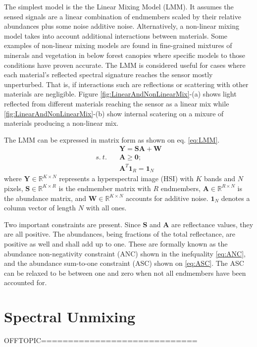 The simplest model is the the Linear Mixing Model (LMM).  It assumes the sensed signals are a linear combination of endmembers scaled by their relative abundances plus some noise additive noise.  Alternatively, a non-linear mixing model takes into account additional interactions between materials.  Some examples of non-linear mixing models are found in fine-grained mixtures of minerals and vegetation in below forest canopies where specific models to those conditions have proven accurate.  The LMM is considered useful for cases where each material's reflected spectral signature reaches the sensor mostly unperturbed.  That is, if interactions such are reflections or scattering with other materials are negligible.  Figure \ref{fig:LinearAndNonLinearMix}-(a) shows light reflected from different materials reaching the sensor as a linear mix while \ref{fig:LinearAndNonLinearMix}-(b) show internal scatering on a mixure of materials producing a non-linear mix.

The LMM can be expressed in matrix form as shown on eq. \eqref{eq:LMM}.
\begin{align}
	&\mathbf{Y}=\mathbf{SA+W} \label{eq:LMM} \\
	s.\ t.\quad &\mathbf{A\geq0}; \label{eq:ANC} \\
	&\mathbf{A}^T\mathbf{1}_{R} =\mathbf{1}_{N} \label{eq:ASC}
\end{align}
where $\mathbf{Y} \in \mathbb{R}^{K \times N}$ represents a hyperspectral image (HSI) with  $K$ bands and $N$ pixels, $\mathbf{S} \in \mathbb{R}^{K \times R}$ is the endmember matrix with $R$ endmembers, $\mathbf{A} \in \mathbb{R}^{R \times N}$ is the abundance matrix, and $\mathbf{W} \in \mathbb{R}^{K \times N}$ accounts for additive noise. $\mathbf{1}_N$ denotes a column vector of length $N$ with all ones.

Two important constraints are present.  Since \textbf{S} and \textbf{A} are reflectance values, they are all positive.  The abundances, being fractions of the total reflectance, are positive as well and shall add up to one.  These are formally known as the abundance non-negativity constraint (ANC) shown in the inefquality \eqref{eq:ANC}, and the abundance sum-to-one constraint (ASC) shown on \eqref{eq:ASC}.  The ASC can be relaxed to be between one and zero when not all endmembers have been accounted for.    

\section{Spectral Unmixing}
OFFTOPIC=============================

